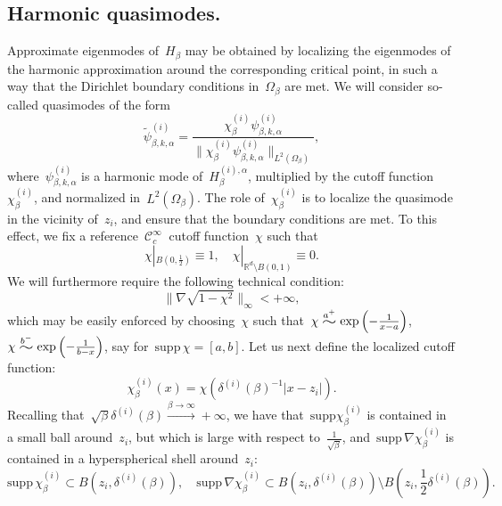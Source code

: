 \documentclass[10pt]{article}
\newcommand{\R}{\mathbb{R}}
\newcommand{\1}{\mathbbm 1}
\newcommand{\supp}{\mathrm{supp}}
\newcommand{\deltai}{\delta^{(i)}}
\newcommand{\widesim}[2][1.5]{
  \mathrel{\overset{#2}{\scalebox{#1}[1]{$\sim$}}}
}
\begin{document}
    \subsection{Harmonic quasimodes.}\label{subsec:quasimodes}
    Approximate eigenmodes of~$H_\beta$ may be obtained by localizing the eigenmodes of the harmonic approximation around the corresponding critical point, in such a way that the Dirichlet boundary conditions in~$\Omega_\beta$ are met.
    We will consider so-called quasimodes of the form
    \begin{equation}
        \label{eq:harm_quasimode}
        \widetilde\psi^{(i)}_{\beta,k,\alpha} = \frac{\chi_\beta^{(i)}\psi_{\beta,k,\alpha}^{(i)}}{\|\chi_\beta^{(i)}\psi_{\beta,k,\alpha}^{(i)}\|_{L^2(\Omega_\beta)}},
    \end{equation}
    where~$\psi_{\beta,k,\alpha}^{(i)}$ is a harmonic mode of~$H_\beta^{(i),\alpha}$, multiplied by the cutoff function~$\chi_\beta^{(i)}$, and normalized in~$L^2(\Omega_\beta)$.
    The role of~$\chi_\beta^{(i)}$ is to localize the quasimode in the vicinity of~$z_i$, and ensure that the boundary conditions are met. To this effect, we fix a reference~$\mathcal C_c^\infty~$ cutoff function~$\chi$ such that
    \[\chi|_{B\left(0,\frac12\right)}\equiv 1,\quad \chi|_{\R^d\setminus B(0,1)} \equiv 0.\]
    We will furthermore require the following technical condition:
    \begin{equation}
        \label{eq:partition_of_unity_condition}
        \|\nabla\sqrt{1-\chi^2}\|_\infty < +\infty,
    \end{equation}
    which may be easily enforced by choosing~$\chi$ such that~$\chi \widesim{a^+} \mathrm{exp}\left(-\frac1{x-a}\right)$,~$\chi\widesim{b^-}\mathrm{exp}\left(-\frac1{b-x}\right)$, say for~$\supp\,\chi = [a,b]$.
    Let us next define the localized cutoff function:
    \begin{equation}
        \label{eq:cutoff}
        \chi_\beta^{(i)}(x) = \chi(\deltai(\beta)^{-1}|x-z_i|).
    \end{equation}
    Recalling that~$\sqrt\beta\deltai(\beta)\overset{\beta\to\infty}{\longrightarrow} + \infty$, we have that~$\supp \chi_\beta^{(i)}$ is contained in a small ball around~$z_i$, but which is large with respect to~$\frac1{\sqrt\beta}$, and~$\supp\,\nabla \chi_\beta^{(i)}$ is contained in a hyperspherical shell around~$z_i$:
    \begin{equation}
        \label{eq:cutoff_supports}
        \supp\,\chi_\beta^{(i)} \subset B(z_i,\deltai(\beta)),\quad\supp\,\nabla\chi_\beta^{(i)} \subset B(z_i,\deltai(\beta))\setminus B\left(z_i,\frac12\deltai(\beta)\right).
    \end{equation}
\end{document}
